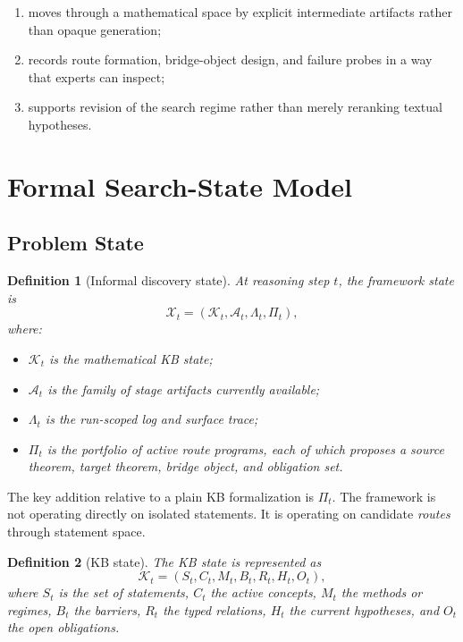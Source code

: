 \documentclass[11pt]{article}
\newtheorem{definition}{Definition}
\begin{document}
\begin{enumerate}[leftmargin=*,itemsep=0.3em]
\item moves through a mathematical space by explicit intermediate artifacts rather than opaque generation;
\item records route formation, bridge-object design, and failure probes in a way that experts can inspect;
\item supports revision of the search regime rather than merely reranking textual hypotheses.
\end{enumerate}

\section{Formal Search-State Model}

\subsection{Problem State}

\begin{definition}[Informal discovery state]
At reasoning step $t$, the framework state is
\[
\mathcal{X}_t = (\mathcal{K}_t, \mathcal{A}_t, \Lambda_t, \Pi_t),
\]
where:
\begin{itemize}[leftmargin=*,itemsep=0.2em]
\item $\mathcal{K}_t$ is the mathematical KB state;
\item $\mathcal{A}_t$ is the family of stage artifacts currently available;
\item $\Lambda_t$ is the run-scoped log and surface trace;
\item $\Pi_t$ is the portfolio of active route programs, each of which proposes a source theorem, target theorem, bridge object, and obligation set.
\end{itemize}
\end{definition}

The key addition relative to a plain KB formalization is $\Pi_t$. The framework is not operating directly on isolated statements. It is operating on candidate \emph{routes} through statement space.

\begin{definition}[KB state]
The KB state is represented as
\[
\mathcal{K}_t = (S_t, C_t, M_t, B_t, R_t, H_t, O_t),
\]
where $S_t$ is the set of statements, $C_t$ the active concepts, $M_t$ the methods or regimes, $B_t$ the barriers, $R_t$ the typed relations, $H_t$ the current hypotheses, and $O_t$ the open obligations.
\end{definition}
\end{document}
